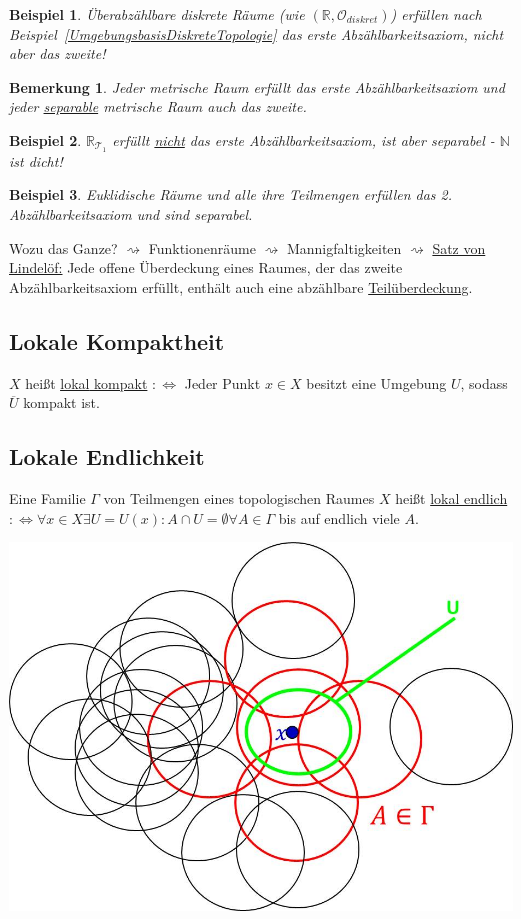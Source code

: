 \documentclass[a4paper,11pt,notitlepage]{report}
\newtheorem{remark}{Bemerkung}[chapter]
\newtheorem{example}{Beispiel}[chapter]
\newcommand{\R}{{\ensuremath{\mathbb{R}}}}
\newcommand{\N}{{\ensuremath{\mathbb{N}}}}
\newcommand{\OO}{{\ensuremath{\mathcal{O}}}}
\newenvironment{Kasten}[1]
{
\hspace{0.05\linewidth}
\begin{center}
\begin{minipage}{0.9\linewidth}
\setlength{\fboxsep}{10pt}
\definecolor{shadecolor}{gray}{1}
\definecolor{framecolor}{gray}{0}
\def\FrameCommand{\fcolorbox{framecolor}{shadecolor}}
\MakeFramed {\FrameRestore}
\subsection{#1}
\begin{itshape}
}
{
\end{itshape}
\endMakeFramed
\end{minipage}
\end{center}
}
\begin{document}
\begin{example}
	Überabzählbare diskrete Räume (wie $(\R, \OO_{diskret})$) erfüllen nach Beispiel~\ref{UmgebungsbasisDiskreteTopologie} das erste Abzählbarkeitsaxiom, nicht aber das zweite!
\end{example}
 
\begin{remark}
	Jeder metrische Raum erfüllt das erste Abzählbarkeitsaxiom und jeder \underline{separable} metrische Raum auch das zweite.
\end{remark} 
 
\begin{example}
	$\R_{\mathcal{T}_1}$ erfüllt \underline{nicht} das erste Abzählbarkeitsaxiom, ist aber separabel - $\N$ ist dicht!
\end{example} 
 
\begin{example}
	Euklidische Räume und alle ihre Teilmengen erfüllen das 2. Abzählbarkeitsaxiom und sind separabel.
\end{example} 
 
Wozu das Ganze? 
\newline $\rightsquigarrow$ Funktionenräume
\newline $\rightsquigarrow$ Mannigfaltigkeiten
\newline $\rightsquigarrow$ \underline{Satz von Lindelöf:}
Jede offene Überdeckung eines Raumes, der das zweite Abzählbarkeitsaxiom erfüllt, enthält auch eine abzählbare \underline{Teilüberdeckung}.
 
\begin{Kasten}{Lokale Kompaktheit}
$X$ heißt \underline{\underline{lokal} kompakt} \newline $:\Leftrightarrow$ Jeder Punkt $x \in X$ besitzt eine Umgebung $U$, sodass $\overline{U}$ kompakt ist.
\end{Kasten} 

\begin{Kasten}{Lokale Endlichkeit}
	Eine Familie $\Gamma$ von Teilmengen eines topologischen Raumes $X$ heißt \underline{lokal endlich} $:\Leftrightarrow \forall x \in X \exists U = U(x) \colon A \cap U = \emptyset \forall A \in \Gamma$ bis auf endlich viele $A$.
\end{Kasten}
\includegraphics[scale=0.5]{images/lokal_endlich.jpg}
 
\end{document}
